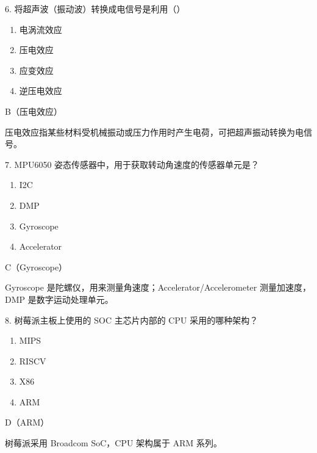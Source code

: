 \begin{question}{6. 将超声波（振动波）转换成电信号是利用（）}
\begin{enumerate}[label=\Alph*., leftmargin=2.4em, itemsep=0.2em]
\item 电涡流效应
\item 压电效应
\item 应变效应
\item 逆压电效应
\end{enumerate}
\end{question}
\begin{answer}
B（压电效应）
\end{answer}
\begin{explanation}
压电效应指某些材料受机械振动或压力作用时产生电荷，可把超声振动转换为电信号。
\end{explanation}

\begin{question}{7. MPU6050 姿态传感器中，用于获取转动角速度的传感器单元是？}
\begin{enumerate}[label=\Alph*., leftmargin=2.4em, itemsep=0.2em]
\item I2C
\item DMP
\item Gyroscope
\item Accelerator
\end{enumerate}
\end{question}
\begin{answer}
C（Gyroscope）
\end{answer}
\begin{explanation}
Gyroscope 是陀螺仪，用来测量角速度；Accelerator/Accelerometer 测量加速度，DMP 是数字运动处理单元。
\end{explanation}

\begin{question}{8. 树莓派主板上使用的 SOC 主芯片内部的 CPU 采用的哪种架构？}
\begin{enumerate}[label=\Alph*., leftmargin=2.4em, itemsep=0.2em]
\item MIPS
\item RISCV
\item X86
\item ARM
\end{enumerate}
\end{question}
\begin{answer}
D（ARM）
\end{answer}
\begin{explanation}
树莓派采用 Broadcom SoC，CPU 架构属于 ARM 系列。
\end{explanation}


